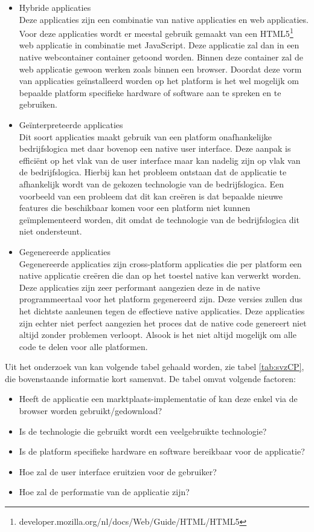 \begin{itemize}
    \item Hybride applicaties\\
    Deze applicaties zijn een combinatie van native applicaties en web applicaties. Voor deze applicaties wordt er meestal gebruik gemaakt van een HTML5\footnote{developer.mozilla.org/nl/docs/Web/Guide/HTML/HTML5} web applicatie in combinatie met JavaScript. Deze applicatie zal dan in een native webcontainer container getoond worden. Binnen deze container zal de web applicatie gewoon werken zoals binnen een browser. Doordat deze vorm van applicaties geïnstalleerd worden op het platform is het wel mogelijk om bepaalde platform specifieke hardware of software aan te spreken en te gebruiken.
    \\
    
    \item Geïnterpreteerde applicaties\\
    Dit soort applicaties maakt gebruik van een platform onafhankelijke bedrijfslogica met daar bovenop een native user interface. Deze aanpak is efficiënt op het vlak van de user interface maar kan nadelig zijn op vlak van de bedrijfslogica. Hierbij kan het probleem ontstaan dat de applicatie te afhankelijk wordt van de gekozen technologie van de bedrijfslogica. Een voorbeeld van een probleem dat dit kan creëren is dat bepaalde nieuwe features die beschikbaar komen voor een platform niet kunnen geïmplementeerd worden, dit omdat de technologie van de bedrijfslogica dit niet ondersteunt.
    \\
    
    \item Gegenereerde applicaties\\
    Gegenereerde applicaties zijn cross-platform applicaties die per platform een native applicatie creëren die dan op het toestel native kan verwerkt worden. Deze applicaties zijn zeer performant aangezien deze in de native programmeertaal voor het platform gegenereerd zijn. Deze versies zullen dus het dichtste aanleunen tegen de effectieve native applicaties. Deze applicaties zijn echter niet perfect aangezien het proces dat de native code genereert niet altijd zonder problemen verloopt. Alsook is het niet altijd mogelijk om alle code te delen voor alle platformen.
\end{itemize}

Uit het onderzoek van \textcite{Xanthopoulos2013} kan volgende tabel gehaald worden, zie tabel  \ref{tab:svzCP},  die bovenstaande informatie kort samenvat. De tabel omvat volgende factoren:
\begin{itemize}
    \item Heeft de applicatie een marktplaats-implementatie of kan deze enkel via de browser worden gebruikt/gedownload?
    \item Is de technologie die gebruikt wordt een veelgebruikte technologie?
    \item Is de platform specifieke hardware en software bereikbaar voor de applicatie?
    \item Hoe zal de user interface eruitzien voor de gebruiker?
    \item Hoe zal de performatie van de applicatie zijn?
\end{itemize}

